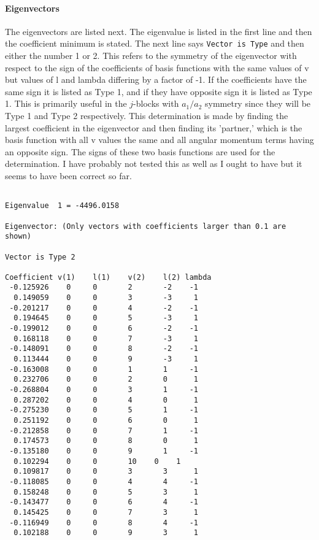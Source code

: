\documentclass{article}
\begin{document}
\paragraph{Eigenvectors}
The eigenvectors are listed next. The eigenvalue is listed in the first line and then the coefficient minimum is stated. The next line says {\tt Vector is Type} and then either the number 1 or 2. This refers to the symmetry of the eigenvector with respect to the sign of the coefficients of basis functions with the same values of v but values of l and lambda differing by a factor of -1. If the coefficients have the same sign it is listed as Type 1, and if they have opposite sign it is listed as Type 1. This is primarily useful in the $j$-blocks with $a_1/a_2$ symmetry since they will be Type 1 and Type 2 respectively. This determination is made by finding the largest coefficient in the eigenvector and then finding its 'partner,' which is the basis function with all v values the same and all angular momentum terms having an opposite sign. The signs of these two basis functions are used for the determination. I have probably not tested this as well as I ought to have but it seems to have been correct so far.

\begin{verbatim}
 
Eigenvalue	1 = -4496.0158 

Eigenvector: (Only vectors with coefficients larger than 0.1 are shown)
 
Vector is Type 2
 
Coefficient	v(1)	l(1)	v(2)	l(2) lambda	
 -0.125926	  0	  	0	  	2	 	-2	  -1	
  0.149059	  0	  	0	  	3	 	-3	   1	
 -0.201217	  0	  	0	  	4	 	-2	  -1	
  0.194645	  0	  	0	  	5	 	-3	   1	
 -0.199012	  0	  	0	  	6	 	-2	  -1	
  0.168118	  0	  	0	  	7	 	-3	   1	
 -0.148091	  0	  	0	  	8	 	-2	  -1	
  0.113444	  0	  	0	  	9	 	-3	   1	
 -0.163008	  0	  	0	  	1	  	1	  -1	
  0.232706	  0	  	0	  	2	  	0	   1	
 -0.268804	  0	  	0	  	3	  	1	  -1	
  0.287202	  0	  	0	  	4	  	0	   1	
 -0.275230	  0	  	0	  	5	  	1	  -1	
  0.251192	  0	  	0	  	6	  	0	   1	
 -0.212858	  0	  	0	  	7	  	1	  -1	
  0.174573	  0	  	0	  	8	  	0	   1	
 -0.135180	  0	  	0	  	9	  	1	  -1	
  0.102294	  0	  	0	  	10	  0	   1	
  0.109817	  0	  	0	  	3	  	3	   1	
 -0.118085	  0	  	0	  	4	  	4	  -1	
  0.158248	  0	  	0	  	5	  	3	   1	
 -0.143477	  0	  	0	  	6	  	4	  -1	
  0.145425	  0	  	0	  	7	  	3	   1	
 -0.116949	  0	  	0	  	8	  	4	  -1	
  0.102188	  0	  	0	  	9	  	3	   1

\end{verbatim}
\end{document}
